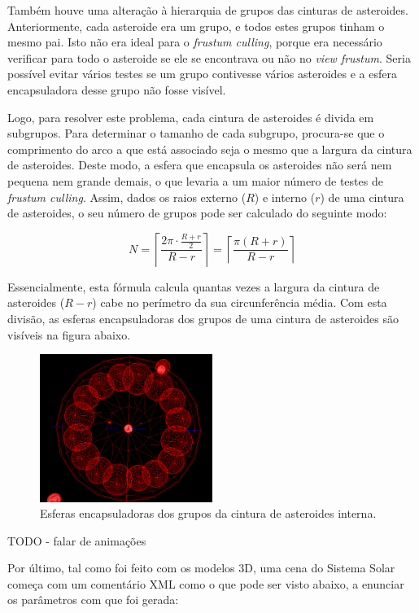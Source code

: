 \documentclass[12pt, a4paper]{article}
\begin{document}
Também houve uma alteração à hierarquia de grupos das cinturas de asteroides. Anteriormente, cada
asteroide era um grupo, e todos estes grupos tinham o mesmo pai. Isto não era ideal para o
\emph{frustum culling}, porque era necessário verificar para todo o asteroide se ele se encontrava
ou não no \emph{view frustum}. Seria possível evitar vários testes se um grupo contivesse vários
asteroides e a esfera encapsuladora desse grupo não fosse visível.

Logo, para resolver este problema, cada cintura de asteroides é divida em subgrupos. Para determinar
o tamanho de cada subgrupo, procura-se que o comprimento do arco a que está associado seja o mesmo
que a largura da cintura de asteroides. Deste modo, a esfera que encapsula os asteroides não será
nem pequena nem grande demais, o que levaria a um maior número de testes de \emph{frustum culling}.
Assim, dados os raios externo ($R$) e interno ($r$) de uma cintura de asteroides, o seu número de
grupos pode ser calculado do seguinte modo:

$$
N = \left \lceil \frac{2 \pi \cdot \frac{R + r}{2}}{R - r} \right \rceil
  = \left \lceil \frac{\pi (R + r)}{R - r} \right \rceil
$$

Essencialmente, esta fórmula calcula quantas vezes a largura da cintura de asteroides ($R - r$) cabe
no perímetro da sua circunferência média. Com esta divisão, as esferas encapsuladoras dos grupos de
uma cintura de asteroides são visíveis na figura abaixo.

\begin{figure}[H]
    \centering
    \includegraphics[width=0.5\textwidth]{res/phase3/AsteroidBeltBoundingSpheres.png}
    \caption{Esferas encapsuladoras dos grupos da cintura de asteroides interna.}
\end{figure}

{\color{red} TODO - falar de animações}

Por último, tal como foi feito com os modelos 3D, uma cena do Sistema Solar começa com um comentário
XML como o que pode ser visto abaixo, a enunciar os parâmetros com que foi gerada:
\end{document}

